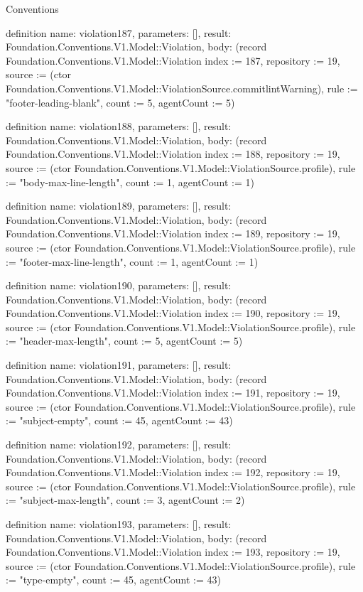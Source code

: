 \begin{lexlean}{Conventions}
\begin{semanticmodule}
definition{
  name: violation187,
  parameters: [],
  result: Foundation.Conventions.V1.Model::Violation,
  body: (record Foundation.Conventions.V1.Model::Violation {index := 187, repository := 19, source := (ctor Foundation.Conventions.V1.Model::ViolationSource.commitlintWarning), rule := "footer-leading-blank", count := 5, agentCount := 5})
}

definition{
  name: violation188,
  parameters: [],
  result: Foundation.Conventions.V1.Model::Violation,
  body: (record Foundation.Conventions.V1.Model::Violation {index := 188, repository := 19, source := (ctor Foundation.Conventions.V1.Model::ViolationSource.profile), rule := "body-max-line-length", count := 1, agentCount := 1})
}

definition{
  name: violation189,
  parameters: [],
  result: Foundation.Conventions.V1.Model::Violation,
  body: (record Foundation.Conventions.V1.Model::Violation {index := 189, repository := 19, source := (ctor Foundation.Conventions.V1.Model::ViolationSource.profile), rule := "footer-max-line-length", count := 1, agentCount := 1})
}

definition{
  name: violation190,
  parameters: [],
  result: Foundation.Conventions.V1.Model::Violation,
  body: (record Foundation.Conventions.V1.Model::Violation {index := 190, repository := 19, source := (ctor Foundation.Conventions.V1.Model::ViolationSource.profile), rule := "header-max-length", count := 5, agentCount := 5})
}

definition{
  name: violation191,
  parameters: [],
  result: Foundation.Conventions.V1.Model::Violation,
  body: (record Foundation.Conventions.V1.Model::Violation {index := 191, repository := 19, source := (ctor Foundation.Conventions.V1.Model::ViolationSource.profile), rule := "subject-empty", count := 45, agentCount := 43})
}

definition{
  name: violation192,
  parameters: [],
  result: Foundation.Conventions.V1.Model::Violation,
  body: (record Foundation.Conventions.V1.Model::Violation {index := 192, repository := 19, source := (ctor Foundation.Conventions.V1.Model::ViolationSource.profile), rule := "subject-max-length", count := 3, agentCount := 2})
}

definition{
  name: violation193,
  parameters: [],
  result: Foundation.Conventions.V1.Model::Violation,
  body: (record Foundation.Conventions.V1.Model::Violation {index := 193, repository := 19, source := (ctor Foundation.Conventions.V1.Model::ViolationSource.profile), rule := "type-empty", count := 45, agentCount := 43})
}


\end{semanticmodule}
\end{lexlean}
